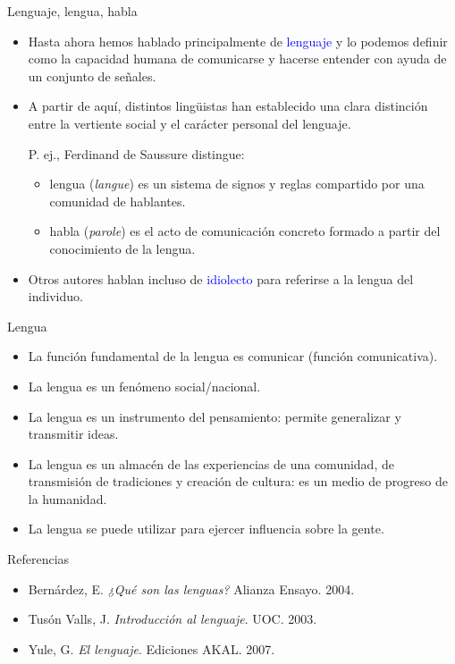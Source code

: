\documentclass[handout]{beamer}
\begin{document}
\begin{frame}{Lenguaje, lengua, habla}

\begin{itemize}
	\item Hasta ahora hemos hablado principalmente de \textcolor{blue}{lenguaje} y lo podemos definir como la capacidad humana de comunicarse y hacerse entender con ayuda de un conjunto de señales.
	
	\item A partir de aquí, distintos lingüistas han establecido una clara distinción entre la vertiente social y el carácter personal del lenguaje.
	
	P. ej., Ferdinand de Saussure distingue:
	\begin{itemize}
		\item lengua (\textit{langue}) es un sistema de signos y reglas compartido por una comunidad de hablantes.
		\item habla (\textit{parole}) es el acto de comunicación concreto formado a partir del conocimiento de la lengua.
	\end{itemize}
	
	\item Otros autores hablan incluso de \textcolor{blue}{idiolecto} para referirse a la lengua del individuo.
\end{itemize}


\end{frame}

\begin{frame}{Lengua}

\begin{itemize}
	\item La función fundamental de la lengua es comunicar (función comunicativa).
	\item La lengua es un fenómeno social/nacional.
	\item La lengua es un instrumento del pensamiento: permite generalizar y transmitir ideas.
	\item La lengua es un almacén de las experiencias de una comunidad, de transmisión de tradiciones y creación de cultura: es un medio de progreso de la humanidad.
	\item La lengua se puede utilizar para ejercer influencia sobre la gente.
\end{itemize}

\end{frame}

\begin{frame}{Referencias}

\begin{itemize}
   \item Bernárdez, E. \textit{¿Qué son las lenguas?} Alianza Ensayo. 2004.
   \item Tusón Valls, J. \textit{Introducción al lenguaje}. UOC. 2003.
   \item Yule, G. \textit{El lenguaje}. Ediciones AKAL. 2007. 
\end{itemize}

\end{frame}
\end{document}

